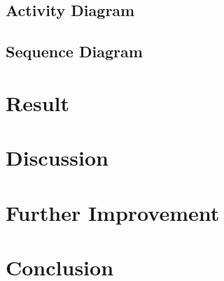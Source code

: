 \documentclass[a4paper,12pt,onepage]{article}
\begin{document}
\newpage
\subsection{Activity Diagram}
\newpage
\subsection{Sequence Diagram}
\newpage

\section{Result}
\newpage
\section{Discussion}

\newpage
\section{Further Improvement}

\newpage
\section{Conclusion}

\newpage


\nocite{*}
\end{document}
